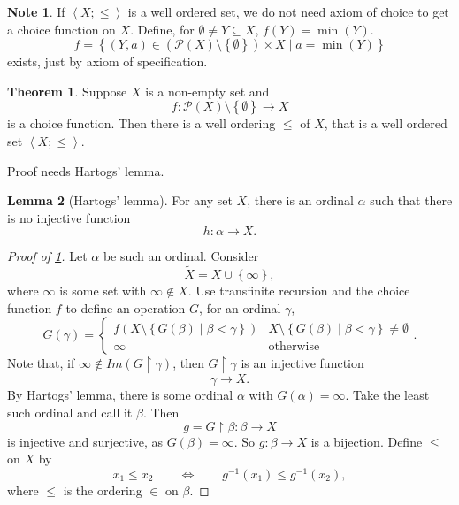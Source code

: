 \documentclass{article}
\newcommand{\rb}[1]{\left( #1 \right)}
\newcommand{\cb}[1]{\left\{ #1 \right\}}
\newcommand{\ab}[1]{\left\langle #1 \right\rangle}
\theoremstyle{definition}\newtheorem{definition}{Definition}[subsection]
\theoremstyle{definition}\newtheorem{remark1}[definition]{Remark}
\theoremstyle{definition}\newtheorem{example1}[definition]{Example}
\theoremstyle{definition}\newtheorem*{remark2}{Remark}
\theoremstyle{definition}\newtheorem*{example2}{Example}
\theoremstyle{definition}\newtheorem*{note}{Note}
\theoremstyle{definition}\newtheorem*{notation}{Notation}
\newtheorem{lemma}[definition]{Lemma}
\newtheorem{theorem}[definition]{Theorem}
\begin{document}
\begin{note}
If $ \ab{X; \le} $ is a well ordered set, we do not need axiom of choice to get a choice function on $ X $. Define, for $ \emptyset \ne Y \subseteq X $, $ f\rb{Y} = \min\rb{Y} $.
$$ f = \cb{\rb{Y, a} \in \rb{\mathcal{P}\rb{X} \setminus \cb{\emptyset}} \times X \mid a = \min\rb{Y}} $$
exists, just by axiom of specification. 
\end{note}

\begin{theorem}
\label{thm:4.1.3}
Suppose $ X $ is a non-empty set and
$$ f : \mathcal{P}\rb{X} \setminus \cb{\emptyset} \to X $$
is a choice function. Then there is a well ordering $ \le $ of $ X $, that is a well ordered set $ \ab{X; \le} $.
\end{theorem}

Proof needs Hartogs' lemma.

\begin{lemma}[Hartogs' lemma]
\label{lem:4.1.4}
For any set $ X $, there is an ordinal $ \alpha $ such that there is no injective function
$$ h : \alpha \to X. $$
\end{lemma}

\begin{proof}[Proof of \ref{thm:4.1.3}]
Let $ \alpha $ be such an ordinal. Consider
$$ \widetilde{X} = X \cup \cb{\infty}, $$
where $ \infty $ is some set with $ \infty \notin X $. Use transfinite recursion and the choice function $ f $ to define an operation $ G $, for an ordinal $ \gamma $,
$$ G\rb{\gamma} = \begin{cases}
f\rb{X \setminus \cb{G\rb{\beta} \mid \beta < \gamma}} & X \setminus \cb{G\rb{\beta} \mid \beta < \gamma} \ne \emptyset \\
\infty & \text{otherwise}
\end{cases}. $$
Note that, if $ \infty \notin Im\rb{G \upharpoonright \gamma} $, then $ G \upharpoonright \gamma $ is an injective function
$$ \gamma \to X. $$
By Hartogs' lemma, there is some ordinal $ \alpha $ with $ G\rb{\alpha} = \infty $. Take the least such ordinal and call it $ \beta $. Then
$$ g = G \upharpoonright \beta : \beta \to X $$
is injective and surjective, as $ G\rb{\beta} = \infty $. So $ g : \beta \to X $ is a bijection. Define $ \le $ on $ X $ by
$$ x_1 \le x_2 \qquad \iff \qquad g^{-1}\rb{x_1} \le g^{-1}\rb{x_2}, $$
where $ \le $ is the ordering $ \in $ on $ \beta $.
\end{proof}

\pagebreak
\end{document}

